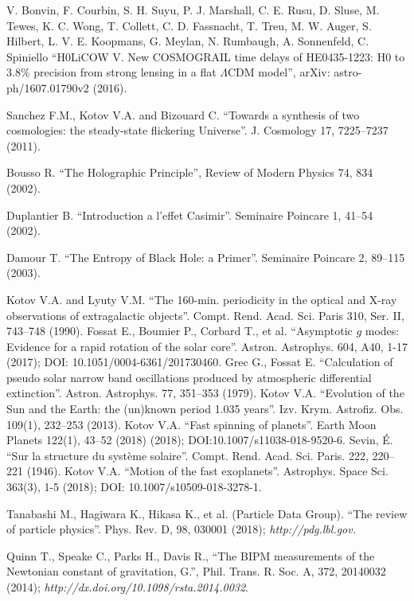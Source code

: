 \documentclass[twoside,draft]{article}
\begin{document}
\begin{sloppypar}
\begin{thebibliography}{99}
 V. Bonvin, F. Courbin, S. H. Suyu, P. J. Marshall, C. E. Rusu, D. Sluse, M. Tewes, K. C. Wong, T. Collett, C. D. Fassnacht, T. Treu, M. W. Auger, S. Hilbert, L. V. E. Koopmans, G. Meylan, N. Rumbaugh, A. Sonnenfeld, C. Spiniello ``H0LiCOW V. New COSMOGRAIL time delays of HE0435-1223: H0 to 3.8\% precision from strong lensing in a flat $\Lambda$CDM model'', arXiv: astro-ph/1607.01790v2 (2016).

 Sanchez F.M., Kotov V.A. and Bizouard C. ``Towards a synthesis of
two cosmologies: the steady-state flickering Universe''. J. Cosmology 17,
7225--7237 (2011).

 Bousso R. ``The Holographic Principle'', Review of Modern Physics
74, 834 (2002).

 Duplantier B. ``Introduction a l'effet Casimir''. Seminaire
Poincare 1, 41--54 (2002).

 Damour T. ``The Entropy of Black Hole: a Primer''. Seminaire
Poincare 2, 89--115 (2003).

 Kotov V.A. and Lyuty V.M. ``The 160-min. periodicity in the optical
and X-ray observations of extragalactic objects''. Compt. Rend. Acad. Sci.
Paris 310, Ser. II, 743--748 (1990). Fossat E., Boumier P., Corbard T., et al.
``Asymptotic $g$ modes: Evidence for a rapid rotation of the solar core''.
Astron. Astrophys. 604, A40, 1-17 (2017); DOI: 10.1051/0004-6361/201730460.
Grec G., Fossat E. ``Calculation of pseudo solar narrow band oscillations
produced by atmospheric differential extinction''. Astron. Astrophys. 77,
351--353 (1979). Kotov V.A. ``Evolution of the Sun and the Earth: the (un)known
period 1.035 years''. Izv. Krym. Astrofiz. Obs. 109(1), 232--253 (2013).
Kotov V.A. ``Fast spinning of planets''. Earth Moon Planets 122(1), 43--52
(2018) (2018); DOI:10.1007/s11038-018-9520-6. Sevin, \'E. ``Sur la structure du
syst\`eme solaire''. Compt. Rend. Acad. Sci. Paris. 222, 220--221 (1946).
Kotov V.A. ``Motion of the fast exoplanets''. Astrophys. Space Sci. 363(3), 1-5
(2018); DOI: 10.1007/s10509-018-3278-1.

 Tanabashi M., Hagiwara K., Hikasa K., et al. (Particle Data
Group). ``The review of particle physics''. Phys. Rev. D, 98, 030001 (2018);
{\it http://pdg.lbl.gov.}

 Quinn T., Speake C., Parks H., Davis R., ``The BIPM measurements
of the Newtonian constant of gravitation, G.'', Phil. Trans. R. Soc. A, 372,
20140032 (2014); {\it http://dx.doi.org/10.1098/rsta.2014.0032}.


\end{thebibliography}
\end{sloppypar}
\end{document}

